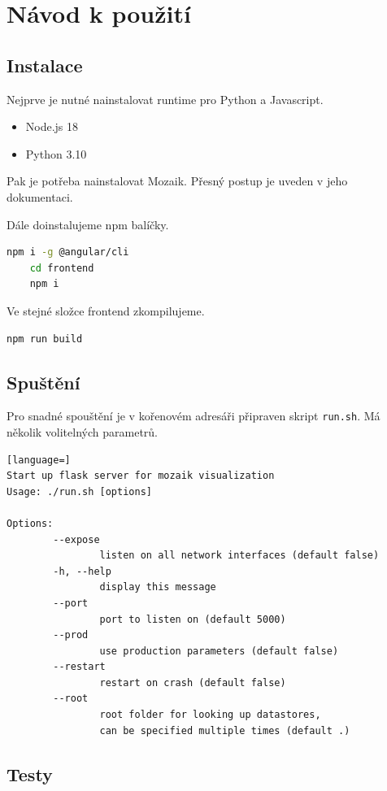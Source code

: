 \chapter{Návod k použití}
\label{chap:howto}

\section{Instalace}

Nejprve je nutné nainstalovat runtime pro Python a Javascript.

\begin{itemize}
	\item Node.js 18
	\item Python 3.10
\end{itemize}

Pak je potřeba nainstalovat Mozaik. Přesný postup je uveden v jeho dokumentaci\cite{MozaikReadme}.

Dále doinstalujeme npm balíčky.

\begin{lstlisting}[language=bash]
	npm i -g @angular/cli
	cd frontend
	npm i
\end{lstlisting}

Ve stejné složce frontend zkompilujeme.

\begin{lstlisting}[language=bash]
	npm run build
\end{lstlisting}

\section{Spuštění}

Pro snadné spouštění je v kořenovém adresáři připraven skript \lstinline|run.sh|. Má několik volitelných parametrů.

\begin{lstlisting}[language=]
Start up flask server for mozaik visualization
Usage: ./run.sh [options]

Options:
		--expose
				listen on all network interfaces (default false)
		-h, --help
				display this message
		--port
				port to listen on (default 5000)
		--prod
				use production parameters (default false)
		--restart
				restart on crash (default false)
		--root
				root folder for looking up datastores,
				can be specified multiple times (default .)
\end{lstlisting}

\section{Testy}


